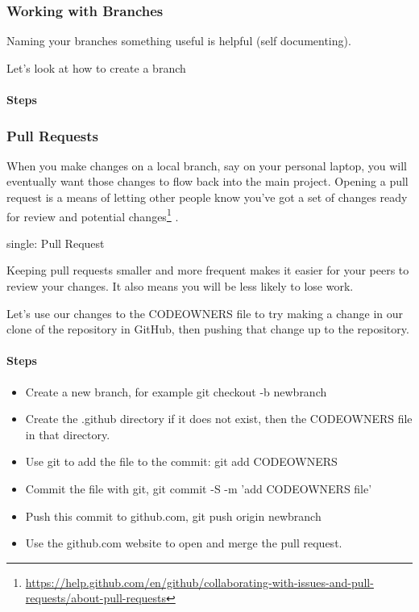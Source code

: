 \hypertarget{working-with-branches}{%
\subsubsection{Working with Branches}\label{working-with-branches}}

Naming your branches something useful is helpful (self documenting).

Let's look at how to create a branch

\hypertarget{steps-3}{%
\paragraph{Steps}\label{steps-3}}

\hypertarget{pull-requests}{%
\subsubsection{Pull Requests}\label{pull-requests}}

When you make changes on a local branch, say on your personal laptop,
you will eventually want those changes to flow back into the main
project. Opening a pull request is a means of letting other people know
you've got a set of changes ready for review and potential
changes\footnote{\url{https://help.github.com/en/github/collaborating-with-issues-and-pull-requests/about-pull-requests}}
.

single: Pull Request

Keeping pull requests smaller and more frequent makes it easier for your
peers to review your changes. It also means you will be less likely to
lose work.

Let's use our changes to the CODEOWNERS file to try making a change in
our clone of the repository in GitHub, then pushing that change up to
the repository.

\hypertarget{steps-4}{%
\paragraph{Steps}\label{steps-4}}

\begin{itemize}
\tightlist
\item
  Create a new branch, for example git checkout -b newbranch
\item
  Create the .github directory if it does not exist, then the CODEOWNERS
  file in that directory.
\item
  Use git to add the file to the commit: git add CODEOWNERS
\item
  Commit the file with git, git commit -S -m 'add CODEOWNERS file'
\item
  Push this commit to github.com, git push origin newbranch
\item
  Use the github.com website to open and merge the pull request.
\end{itemize}

